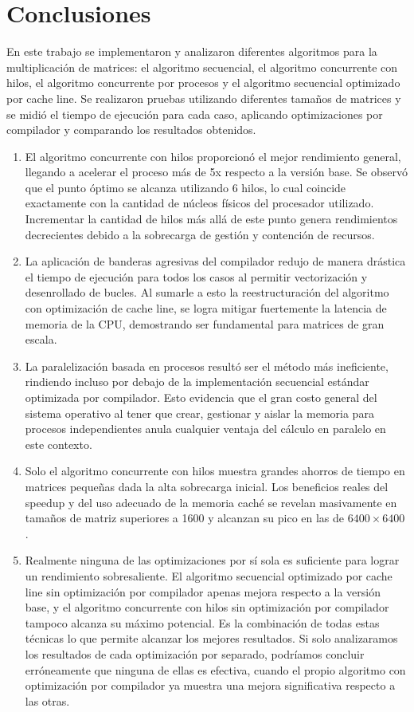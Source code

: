 
\section{Conclusiones}
\label{sec:Conclusiones}

En este trabajo se implementaron y analizaron diferentes algoritmos para la multiplicación de matrices: el algoritmo secuencial, el algoritmo concurrente con hilos, el algoritmo concurrente por procesos y el algoritmo secuencial optimizado por cache line. Se realizaron pruebas utilizando diferentes tamaños de matrices y se midió el tiempo de ejecución para cada caso, aplicando optimizaciones por compilador y comparando los resultados obtenidos.

\begin{enumerate}
   \item El algoritmo concurrente con hilos proporcionó el mejor rendimiento general, llegando a acelerar el proceso más de 5x respecto a la versión base. Se observó que el punto óptimo se alcanza utilizando 6 hilos, lo cual coincide exactamente con la cantidad de núcleos físicos del procesador utilizado. Incrementar la cantidad de hilos más allá de este punto genera rendimientos decrecientes debido a la sobrecarga de gestión y contención de recursos.
   \item La aplicación de banderas agresivas del compilador redujo de manera drástica el tiempo de ejecución para todos los casos al permitir vectorización y desenrollado de bucles. Al sumarle a esto la reestructuración del algoritmo con optimización de cache line, se logra mitigar fuertemente la latencia de memoria de la CPU, demostrando ser fundamental para matrices de gran escala.
   \item La paralelización basada en procesos resultó ser el método más ineficiente, rindiendo incluso por debajo de la implementación secuencial estándar optimizada por compilador. Esto evidencia que el gran costo general del sistema operativo al tener que crear, gestionar y aislar la memoria para procesos independientes anula cualquier ventaja del cálculo en paralelo en este contexto.
   \item Solo el algoritmo concurrente con hilos muestra grandes ahorros de tiempo en matrices pequeñas dada la alta sobrecarga inicial. Los beneficios reales del speedup y del uso adecuado de la memoria caché se revelan masivamente en tamaños de matriz superiores a 1600 y alcanzan su pico en las de $6400\times6400$.
   \item Realmente ninguna de las optimizaciones por sí sola es suficiente para lograr un rendimiento sobresaliente. El algoritmo secuencial optimizado por cache line sin optimización por compilador apenas mejora respecto a la versión base, y el algoritmo concurrente con hilos sin optimización por compilador tampoco alcanza su máximo potencial. Es la combinación de todas estas técnicas lo que permite alcanzar los mejores resultados. Si solo analizaramos los resultados de cada optimización por separado, podríamos concluir erróneamente que ninguna de ellas es efectiva, cuando el propio algoritmo con optimización por compilador ya muestra una mejora significativa respecto a las otras.

\end{enumerate}
